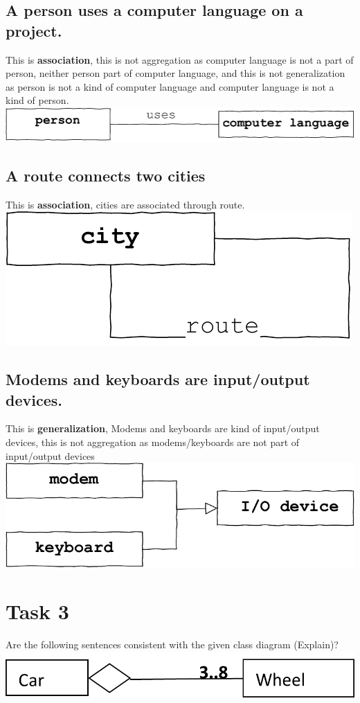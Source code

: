 \documentclass[12pt]{article}
\begin{document}
\subsection{A person uses a computer language on a project. }
This is \textbf{association}, this is not aggregation as computer language is not a part of person, neither person part of computer language, and this is not generalization as person is not a kind of computer language and computer language is not a kind of person.
\\ \includegraphics[width=\textwidth]{35}
\subsection{A route connects two cities }
This is \textbf{association}, cities are associated through route.
\\ \includegraphics[width=\textwidth]{36}


\subsection{Modems and keyboards are input/output devices. }
This is \textbf{generalization}, Modems and keyboards are kind of input/output devices, this is not aggregation as modems/keyboards are not part of input/output devices
\\ \includegraphics[width=\textwidth]{37}
\section{Task 3}
Are the following sentences consistent with the given class diagram (Explain)?
\\
\includegraphics[width=\textwidth]{Class1_103.png}
\end{document}
